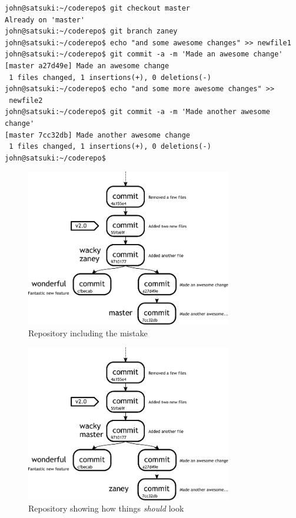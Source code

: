 \begin{Verbatim}
john@satsuki:~/coderepo$ git checkout master
Already on 'master'
john@satsuki:~/coderepo$ git branch zaney
john@satsuki:~/coderepo$ echo "and some awesome changes" >> newfile1
john@satsuki:~/coderepo$ git commit -a -m 'Made an awesome change'
[master a27d49e] Made an awesome change
 1 files changed, 1 insertions(+), 0 deletions(-)
john@satsuki:~/coderepo$ echo "and some more awesome changes" >>
 newfile2
john@satsuki:~/coderepo$ git commit -a -m 'Made another awesome change'
[master 7cc32db] Made another awesome change
 1 files changed, 1 insertions(+), 0 deletions(-)
john@satsuki:~/coderepo$
\end{Verbatim}

\begin{figure}[hbt]
\centering
\includegraphics[width=9cm]{images/f-w4-d3.pdf}
\caption{Repository including the mistake}
\end{figure}

\begin{figure}[hbt]
\centering
\includegraphics[width=9cm]{images/f-w4-d4.pdf}
\caption{Repository showing how things \emph{should} look}
\end{figure}

